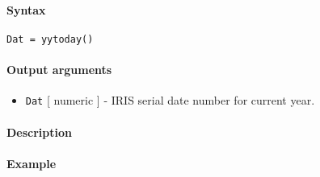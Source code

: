 


	\paragraph{Syntax}\label{syntax}

\begin{verbatim}
Dat = yytoday()
\end{verbatim}

\paragraph{Output arguments}\label{output-arguments}

\begin{itemize}
\itemsep1pt\parskip0pt
\item
  \texttt{Dat} {[} numeric {]} - IRIS serial date number for current
  year.
\end{itemize}

\paragraph{Description}\label{description}

\paragraph{Example}\label{example}


